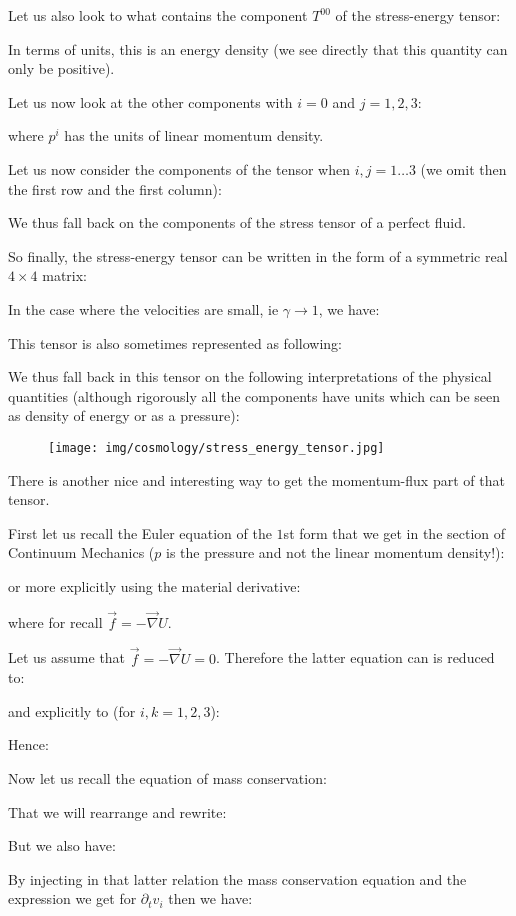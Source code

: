 	Let us also look to what contains the component $T^{00}$ of the stress-energy tensor:
	
	In terms of units, this is an energy density (we see directly that this quantity can only be positive).

	Let us now look at the other components with $i=0$ and $j=1,2,3$:
	
	where $p^i$ has the units of linear momentum density.

	Let us now consider the components of the tensor when $i,j=1\ldots 3$ (we omit then the first row and the first column):
	
	We thus fall back on the components of the stress tensor of a perfect fluid.

	So finally, the stress-energy tensor can be written in the form of a symmetric real $4\times 4$ matrix:
	
	In the case where the velocities are small, ie $\gamma\rightarrow 1$, we have:
	
	This tensor is also sometimes represented as following:
	
	We thus fall back in this tensor on the following interpretations of the physical quantities (although rigorously all the components have units which can be seen as density of energy or as a pressure):
	\begin{figure}[H]
		\centering
		\texttt{[image: img/cosmology/stress\_energy\_tensor.jpg]}	
	\end{figure}
	There is another nice and interesting way to get the momentum-flux part of that tensor. 
	
	First let us recall the Euler equation of the $1$st form that we get in the section of Continuum Mechanics ($p$ is the pressure and not the linear momentum density!):
	
	or more explicitly using the material derivative:
	
	where for recall $\vec{f}=-\vec{\nabla}U$.
	
	Let us assume that $\vec{f}=-\vec{\nabla}U=0$. Therefore the latter equation can is reduced to:
	
	and explicitly to (for $i,k=1,2,3$):
	
	Hence:
	
	Now let us recall the equation of mass conservation:
	
	That we will rearrange and rewrite:
	
	But we also have:
	
	By injecting in that latter relation the mass conservation equation and the expression we get for $\partial_t v_i$ then we have:
	
